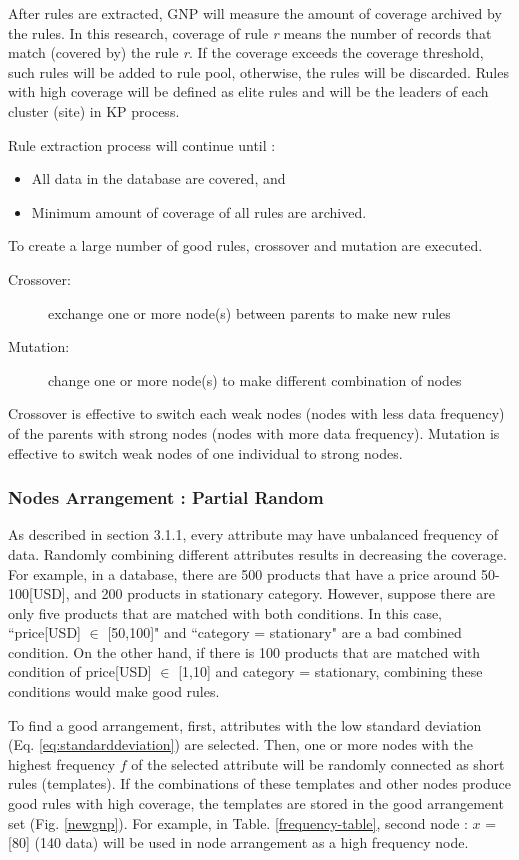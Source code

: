 \documentclass[fleqn,10pt,twocolumn]{SICE14}
\begin{document}
After rules are extracted, GNP will measure the amount of coverage archived by the rules. In this research, coverage of rule {\it r} means the number of records that match (covered by) the rule {\it r}. If the coverage exceeds the coverage threshold, such rules will be added to rule pool, otherwise, the rules will be discarded. Rules with high coverage will be defined as elite rules and will be the leaders of each cluster (site) in KP process.

Rule extraction process will continue until :
\begin{itemize}
\item All data in the database are covered, and
\item Minimum amount of coverage of all rules are archived.
\end{itemize}

To create a large number of good rules, crossover and mutation are executed.
\begin{description}
\item [Crossover:] exchange one or more node(s) between parents to make new rules
\item [Mutation:] change one or more node(s) to make different combination of nodes
\end{description}
Crossover is effective to switch each weak nodes (nodes with less data frequency) of the parents with strong nodes (nodes with more data frequency). Mutation is effective to switch weak nodes of one individual to strong nodes.

\subsubsection{Nodes Arrangement : Partial Random}
As described in section 3.1.1, every attribute may have unbalanced frequency of data. Randomly combining different attributes results in decreasing the coverage. For example, in a database, there are 500 products that have a price around 50-100[USD], and 200 products in stationary category. 
However, suppose there are only five products that are matched with both conditions. In this case, ``price[USD] $\in$ [50,100]" and ``category = stationary" are a bad combined condition. On the other hand, if there is 100 products that are matched with condition of price[USD] $\in$ [1,10] and category = stationary, combining these conditions would make good rules.

To find a good arrangement, first, attributes with the low standard deviation (Eq. \ref{eq:standarddeviation}) are selected. 
Then, one or more nodes with the highest frequency $f$ of the selected attribute will be randomly connected as short rules (templates). 
If the combinations of these templates and other nodes produce good rules with high coverage, the templates are stored in the good arrangement set (Fig. \ref{newgnp}).
For example, in Table. \ref{frequency-table}, second node : $x$ = [80] (140 data) will be used in node arrangement as a high frequency node.
\end{document}
